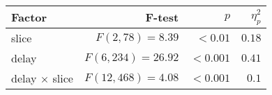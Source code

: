

\setlength{\tabcolsep}{0pt} %
\begin{tabular*}{\columnwidth}{@{\extracolsep{\fill}\quad}lrrr@{}}
\textbf{Factor} & \textbf{F-test} & \textbf{\(p\)} & \textbf{\(\eta^{2}_{p}\)} \\ \toprule
slice & \(F(2, 78) = 8.39\) & \(<0.01\) & \(0.18\) \\
delay & \(F(6, 234) = 26.92\) & \(<0.001\) & \(0.41\) \\
delay \(\times\) slice & \(F(12, 468) = 4.08\) & \(<0.001\) & \(0.1\) \\ \bottomrule
\end{tabular*}%